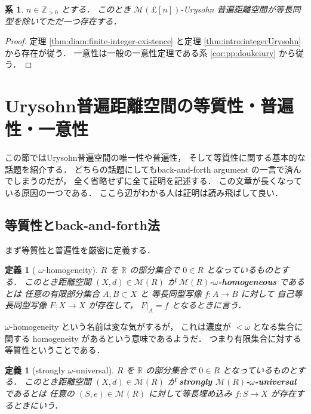 \documentclass[leqno, 12pt]{jsarticle}
\newtheorem{cor}[thm]{系}
\newtheorem{df}[thm]{定義}
\newcommand{\zz}{\mathbb{Z}}
\newcommand{\rr}{\mathbb{R}}
\newcommand{\Met}[1]{\mathscr{M}(#1)}
\newcommand{\restr}[2]{#1|_{#2}}
\newcommand{\pospart}[1]{#1_{>0}}
\newcommand{\zzpos}{\pospart{\zz}}
\newcommand{\Rint}[1]{\mathsterling[#1]}
\begin{document}
\begin{cor}\label{cor:diam:finite-integer-urysohn}
$n\in\zzpos$
とする．
このとき
$\Met{\Rint{n}}$-Urysohn
普遍距離空間が等長同型を除いてただ一つ存在する．
\end{cor}
\begin{proof}
定理
\ref{thm:diam:finite-integer-existence}
と定理
\ref{thm:intro:integerUrysohn}
から存在が従う．
一意性は一般の一意性定理である系
\ref{cor:pp:doukeiury}
から従う．
\end{proof}



\newpage
\section{Urysohn普遍距離空間の等質性・普遍性・一意性}\label{sec:uryunique}

この節ではUrysohn普遍空間の唯一性や普遍性，
そして等質性に関する基本的な
話題を紹介する．
どちらの話題にしてもback-and-forth argument
の一言で済んでしまうのだが，
全く省略せずに全て証明を記述する．
この文章が長くなっている原因の一つである．
ここら辺がわかる人は証明は読み飛ばして良い．

\subsection{等質性とback-and-forth法}\label{subsec:uniqueness:back-and-forth}
まず等質性と普遍性を厳密に定義する．

\begin{df}[%
$\omega$-homogeneity]\label{df:pp:hom}
$R$
を
$\rr$
の部分集合で
$0\in R$
となっているものとする．
このとき距離空間
$(X, d)\in \Met{R}$
が
\textbf{%
$\Met{R}$-$\omega$-homogeneous}
であるとは
任意の有限部分集合
$A, B\subset  X$%
と
等長同型写像
$f\colon  A\to B$
に対して
自己等長同型写像
$F\colon X\to X$
が存在して，
$\restr{F}{A}=f$
となるときに言う．
\end{df}
$\omega$-homogeneity
という名前は変な気がするが，
これは濃度が
$<\omega$%
となる集合に関する
homogeneity
があるという意味であるようだ．
つまり有限集合に対する等質性ということである．





\begin{df}[strongly
$\omega$-universal]\label{df:pp:univ}
$R$
を
$\rr$
の部分集合で
$0\in R$
となっているものとする．
このとき距離空間
$(X, d)\in \Met{R}$
が
\textbf{strongly
$\Met{R}$-$\omega$-universal}
であるとは
任意の
$(S, e)\in \Met{R}$
に対して等長埋め込み
$f\colon S\to X$
が存在するときにいう．
\end{df}
\end{document}

